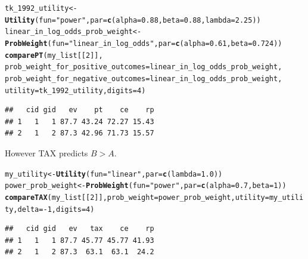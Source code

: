 \documentclass{article}\usepackage[]{graphicx}\usepackage[]{color}
\makeatletter
\newcommand{\hlnum}[1]{\textcolor[rgb]{0.686,0.059,0.569}{#1}}%
\newcommand{\hlstr}[1]{\textcolor[rgb]{0.192,0.494,0.8}{#1}}%
\newcommand{\hlopt}[1]{\textcolor[rgb]{0,0,0}{#1}}%
\newcommand{\hlstd}[1]{\textcolor[rgb]{0.345,0.345,0.345}{#1}}%
\newcommand{\hlkwb}[1]{\textcolor[rgb]{0.69,0.353,0.396}{#1}}%
\newcommand{\hlkwc}[1]{\textcolor[rgb]{0.333,0.667,0.333}{#1}}%
\newcommand{\hlkwd}[1]{\textcolor[rgb]{0.737,0.353,0.396}{\textbf{#1}}}%
\newenvironment{kframe}{%
 \def\at@end@of@kframe{}%
 \ifinner\ifhmode%
  \def\at@end@of@kframe{\end{minipage}}%
  \begin{minipage}{\columnwidth}%
 \fi\fi%
 \def\FrameCommand##1{\hskip\@totalleftmargin \hskip-\fboxsep
 \colorbox{shadecolor}{##1}\hskip-\fboxsep
     \hskip-\linewidth \hskip-\@totalleftmargin \hskip\columnwidth}%
 \MakeFramed {\advance\hsize-\width
   \@totalleftmargin\z@ \linewidth\hsize
   \@setminipage}}%
 {\par\unskip\endMakeFramed%
 \at@end@of@kframe}
\newenvironment{knitrout}{}{} %
\makeatother
\begin{document}
\begin{knitrout}
\color{fgcolor}\begin{kframe}
\begin{alltt}
\hlstd{tk_1992_utility} \hlkwb{<-} \hlkwd{Utility}\hlstd{(}\hlkwc{fun}\hlstd{=}\hlstr{"power"}\hlstd{,} \hlkwc{par}\hlstd{=}\hlkwd{c}\hlstd{(}\hlkwc{alpha}\hlstd{=}\hlnum{0.88}\hlstd{,} \hlkwc{beta}\hlstd{=}\hlnum{0.88}\hlstd{,} \hlkwc{lambda}\hlstd{=}\hlnum{2.25}\hlstd{))}
\hlstd{linear_in_log_odds_prob_weight} \hlkwb{<-} \hlkwd{ProbWeight}\hlstd{(}\hlkwc{fun}\hlstd{=}\hlstr{"linear_in_log_odds"}\hlstd{,} \hlkwc{par}\hlstd{=}\hlkwd{c}\hlstd{(}\hlkwc{alpha}\hlstd{=}\hlnum{0.61}\hlstd{,} \hlkwc{beta}\hlstd{=}\hlnum{0.724}\hlstd{))}
\hlkwd{comparePT}\hlstd{(my_list[[}\hlnum{2}\hlstd{]],}
        \hlkwc{prob_weight_for_positive_outcomes}\hlstd{=linear_in_log_odds_prob_weight,}
        \hlkwc{prob_weight_for_negative_outcomes}\hlstd{=linear_in_log_odds_prob_weight,}
        \hlkwc{utility}\hlstd{=tk_1992_utility,} \hlkwc{digits}\hlstd{=}\hlnum{4}\hlstd{)}
\end{alltt}
\begin{verbatim}
##   cid gid   ev    pt    ce    rp
## 1   1   1 87.7 43.24 72.27 15.43
## 2   1   2 87.3 42.96 71.73 15.57
\end{verbatim}
\end{kframe}
\end{knitrout}


However TAX predicts $B > A$.

\begin{knitrout}
\color{fgcolor}\begin{kframe}
\begin{alltt}
\hlstd{my_utility} \hlkwb{<-} \hlkwd{Utility}\hlstd{(}\hlkwc{fun}\hlstd{=}\hlstr{"linear"}\hlstd{,} \hlkwc{par}\hlstd{=}\hlkwd{c}\hlstd{(}\hlkwc{lambda}\hlstd{=}\hlnum{1.0}\hlstd{))}
\hlstd{power_prob_weight} \hlkwb{<-} \hlkwd{ProbWeight}\hlstd{(}\hlkwc{fun}\hlstd{=}\hlstr{"power"}\hlstd{,} \hlkwc{par}\hlstd{=}\hlkwd{c}\hlstd{(}\hlkwc{alpha}\hlstd{=}\hlnum{0.7}\hlstd{,} \hlkwc{beta}\hlstd{=}\hlnum{1}\hlstd{))}
\hlkwd{compareTAX}\hlstd{(my_list[[}\hlnum{2}\hlstd{]],} \hlkwc{prob_weight}\hlstd{=power_prob_weight,} \hlkwc{utility}\hlstd{=my_utility,} \hlkwc{delta}\hlstd{=}\hlopt{-}\hlnum{1}\hlstd{,} \hlkwc{digits}\hlstd{=}\hlnum{4}\hlstd{)}
\end{alltt}
\begin{verbatim}
##   cid gid   ev   tax    ce    rp
## 1   1   1 87.7 45.77 45.77 41.93
## 2   1   2 87.3  63.1  63.1  24.2
\end{verbatim}
\end{kframe}
\end{knitrout}
\end{document}
